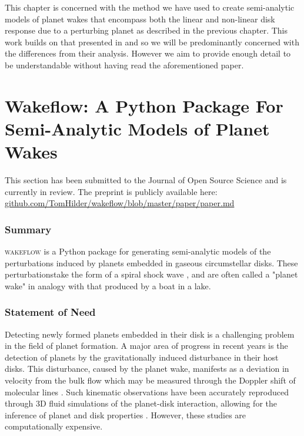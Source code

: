 \setlength{\headheight}{13.59999pt}

This chapter is concerned with the method we have used to create semi-analytic models of planet wakes that encompass both the linear and non-linear disk response due to a perturbing planet as described in the previous chapter. 
This work builds on that presented in \citet{bollati2021} and so we will be predominantly concerned with the differences from their analysis.
However we aim to provide enough detail to be understandable without having read the aforementioned paper.

\section{Wakeflow: A Python Package For Semi-Analytic Models of Planet Wakes} \label{sec:JOSS}

This section has been submitted to the Journal of Open Source Science and is currently in review. The preprint is publicly available here: \url{github.com/TomHilder/wakeflow/blob/master/paper/paper.md}

\subsubsection{Summary}

\textsc{wakeflow} is a Python package for generating semi-analytic models of the perturbations induced by planets embedded in gaseous circumstellar disks. 
These perturbationstake the form of a spiral shock wave \citep{ogilvie2002}, and are often called a "planet wake" in analogy with that produced by a boat in a lake.

\subsubsection{Statement of Need}

Detecting newly formed planets embedded in their disk is a challenging problem in the field of planet formation. 
A major area of progress in recent years is the detection of planets by the gravitationally induced disturbance in their host disks. 
This disturbance, caused by the planet wake, manifests as a deviation in velocity from the bulk flow which may be measured through the Doppler shift of molecular lines \citep[eg.][]{perez2015, pinte2018a}. 
Such kinematic observations have been accurately reproduced through 3D fluid simulations of the planet-disk interaction, allowing for the inference of planet and disk properties \citep{pinte2018a, pinte2019}. 
However, these studies are computationally expensive.

